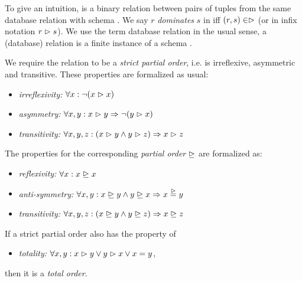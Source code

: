 To give an intuition, \dominates is a binary relation between pairs of
tuples from the same database relation  with schema
. We say $r$ \emph{dominates} $s$ in  iff $(r, s)
\in \vartriangleright$ (or in infix notation $r \vartriangleright s$).  We use the
term database relation in the usual sense, a (database) relation
 is a finite instance of a schema .

We require the relation \dominates to be a \emph{strict partial
order}, i.e. \dominates is irreflexive,
asymmetric and transitive. These properties are formalized as usual:

\begin{itemize}
\item \emph{irreflexivity:} 
$\forall x: \neg (x \vartriangleright x)$

\item \emph{asymmetry:} 
$\forall x, y: x \vartriangleright y \Rightarrow \neg (y \vartriangleright x)$

\item \emph{transitivity:} 
$\forall x, y, z: (x \vartriangleright y \land y \vartriangleright z) \Rightarrow x \vartriangleright z$

\end{itemize}

\noindent
The properties for the corresponding \emph{partial order}
$\trianglerighteq$ are formalized as:
\begin{itemize}
\item \emph{reflexivity:} 
$\forall x: x \trianglerighteq x$

\item \emph{anti-symmetry:} 
$\forall x, y: x \trianglerighteq y \land y \trianglerighteq x \Rightarrow x \stackrel{\vartriangleright}{=} y$

\item \emph{transitivity:} 
$\forall x, y, z: (x \trianglerighteq y \land y \trianglerighteq z) \Rightarrow x \trianglerighteq z$
\end{itemize}

\noindent
If a strict partial order also has the property of

\begin{itemize}
\item \emph{totality:} $\forall x, y: x \vartriangleright y \lor y \vartriangleright x \lor x = y$,
\end{itemize}

\noindent
then it is a \emph{total order}.


